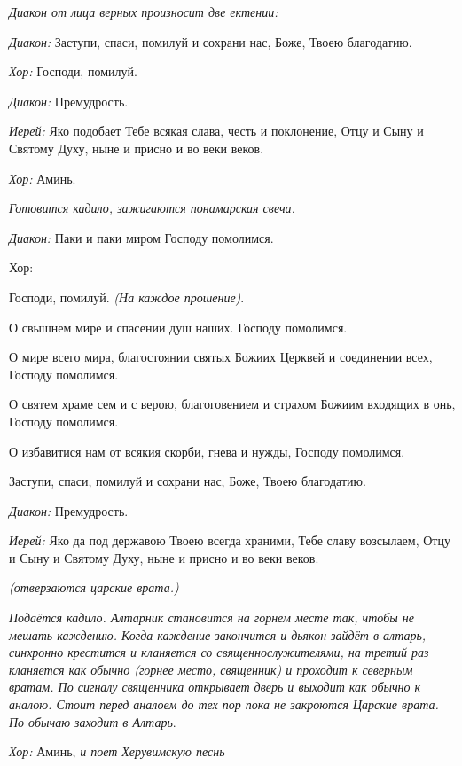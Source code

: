 \begin{mymulticols}


{\itshape Диакон от лица верных произносит две ектении:}

{\itshape Диакон:} Заступи, спаси, помилуй и сохрани нас, Боже, Твоею благодатию.

{\itshape Хор:} Господи, помилуй.

{\itshape Диакон:} Премудрость.

{\itshape Иерей:} Яко подобает Тебе всякая слава, честь и поклонение, Отцу и Сыну и Святому Духу, ныне и присно и во веки веков.

{\itshape Хор:} Аминь.

{\itshape Готовится кадило, зажигаются понамарская свеча.}

{\itshape Диакон:} Паки и паки миром Господу помолимся.  {\itshape 

Хор:} Господи, помилуй. {\itshape (На каждое прошение)}. 

О свышнем мире и спасении душ наших. Господу помолимся. 

О мире всего мира, благостоянии святых Божиих Церквей и соединении всех, Господу помолимся. 

О святем храме сем и с верою, благоговением и страхом Божиим входящих в онь, Господу помолимся. 

О избавитися нам от всякия скорби, гнева и нужды, Господу помолимся. 

Заступи, спаси, помилуй и сохрани нас, Боже, Твоею благодатию. 

{\itshape Диакон:} Премудрость. 

{\itshape Иерей:} Яко да под державою Твоею всегда храними, Тебе славу возсылаем, Отцу и Сыну и Святому Духу, ныне и присно и во веки веков. 

{\itshape (отверзаются царские врата.)}

{\itshape Подаётся кадило. Алтарник становится на горнем месте так, чтобы не мешать каждению. Когда каждение закончится и дьякон зайдёт в алтарь, синхронно крестится и кланяется со священнослужителями, на третий раз кланяется как обычно (горнее место, священник) и проходит к северным вратам. По сигналу священника открывает дверь и выходит как обычно к аналою. Стоит перед аналоем до тех пор пока не закроются Царские врата. По обычаю заходит в Алтарь}. 

{\itshape Хор:} Аминь, {\itshape и поет Херувимскую песнь }


\end{mymulticols}

